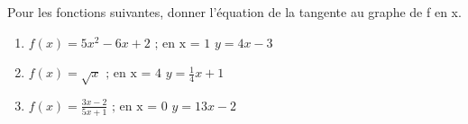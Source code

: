 \begin{solution}
Pour les fonctions suivantes, donner l'équation de la tangente au graphe de f en x. 
\begin{enumerate}
\item $f(x)=5{{x}^{2}}-6x+2\text{  ;  en x = 1}$	$y=4x-3$
\item $f(x)=\sqrt{x}\text{  ;  en x = 4}$		$y=\frac{1}{4}x+1$
\item $f(x)=\frac{3x-2}{5x+1}\text{  ;  en x = 0}$	$y=13x-2$
\end{enumerate}
\end{solution}